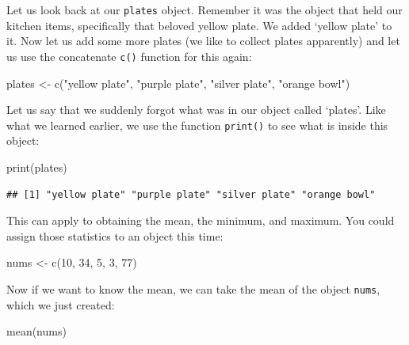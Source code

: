 \documentclass[
]{book}
\newenvironment{Shaded}{\begin{snugshade}}{\end{snugshade}}
\newcommand{\DecValTok}[1]{\textcolor[rgb]{0.00,0.00,0.81}{#1}}
\newcommand{\FunctionTok}[1]{\textcolor[rgb]{0.00,0.00,0.00}{#1}}
\newcommand{\NormalTok}[1]{#1}
\newcommand{\OtherTok}[1]{\textcolor[rgb]{0.56,0.35,0.01}{#1}}
\newcommand{\StringTok}[1]{\textcolor[rgb]{0.31,0.60,0.02}{#1}}
\begin{document}
Let us look back at our \texttt{plates} object. Remember it was the object that held our kitchen items, specifically that beloved yellow plate. We added `yellow plate' to it. Now let us add some more plates (we like to collect plates apparently) and let us use the concatenate \texttt{c()} function for this again:

\begin{Shaded}
\begin{Highlighting}[]
\NormalTok{plates }\OtherTok{\textless{}{-}} \FunctionTok{c}\NormalTok{(}\StringTok{"yellow plate"}\NormalTok{, }\StringTok{"purple plate"}\NormalTok{, }\StringTok{"silver plate"}\NormalTok{, }\StringTok{"orange bowl"}\NormalTok{)}
\end{Highlighting}
\end{Shaded}

Let us say that we suddenly forgot what was in our object called `plates'. Like what we learned earlier, we use the function \texttt{print()} to see what is inside this object:

\begin{Shaded}
\begin{Highlighting}[]
\FunctionTok{print}\NormalTok{(plates)}
\end{Highlighting}
\end{Shaded}

\begin{verbatim}
## [1] "yellow plate" "purple plate" "silver plate" "orange bowl"
\end{verbatim}

This can apply to obtaining the mean, the minimum, and maximum. You could assign those statistics to an object this time:

\begin{Shaded}
\begin{Highlighting}[]
\NormalTok{nums }\OtherTok{\textless{}{-}} \FunctionTok{c}\NormalTok{(}\DecValTok{10}\NormalTok{, }\DecValTok{34}\NormalTok{, }\DecValTok{5}\NormalTok{, }\DecValTok{3}\NormalTok{, }\DecValTok{77}\NormalTok{)}
\end{Highlighting}
\end{Shaded}

Now if we want to know the mean, we can take the mean of the object \texttt{nums}, which we just created:

\begin{Shaded}
\begin{Highlighting}[]
\FunctionTok{mean}\NormalTok{(nums)}
\end{Highlighting}
\end{Shaded}
\end{document}
